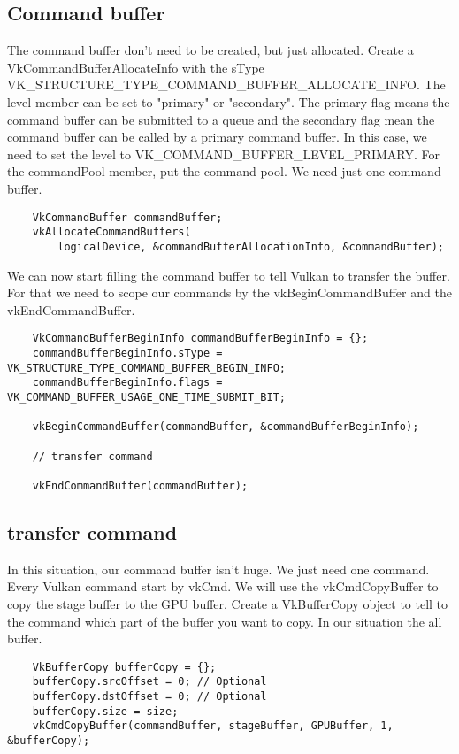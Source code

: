 \documentclass{article}
\begin{document}
\subsection{Command buffer}
The command buffer don't need to be created, but just allocated. Create a VkCommandBufferAllocateInfo with the sType VK\_STRUCTURE\_TYPE\_COMMAND\_BUFFER\_ALLOCATE\_INFO. The level member can be set to "primary" or "secondary". The primary flag means the command buffer can be submitted to a queue and the secondary flag mean the command buffer can be called by a primary command buffer. In this case, we need to set the level to VK\_COMMAND\_BUFFER\_LEVEL\_PRIMARY. For the commandPool member, put the command pool. We need just one command buffer.
\begin{lstlisting}
	VkCommandBuffer commandBuffer;
	vkAllocateCommandBuffers(
		logicalDevice, &commandBufferAllocationInfo, &commandBuffer);
\end{lstlisting}
We can now start filling the command buffer to tell Vulkan to transfer the buffer. For that we need to scope our commands by the vkBeginCommandBuffer and the vkEndCommandBuffer.
\begin{lstlisting}
	VkCommandBufferBeginInfo commandBufferBeginInfo = {};
	commandBufferBeginInfo.sType = VK_STRUCTURE_TYPE_COMMAND_BUFFER_BEGIN_INFO;
	commandBufferBeginInfo.flags = VK_COMMAND_BUFFER_USAGE_ONE_TIME_SUBMIT_BIT;

	vkBeginCommandBuffer(commandBuffer, &commandBufferBeginInfo);

	// transfer command

	vkEndCommandBuffer(commandBuffer);
\end{lstlisting}

\subsection{transfer command}
In this situation, our command buffer isn't huge. We just need one command. Every Vulkan command start by vkCmd. We will use the vkCmdCopyBuffer to copy the stage buffer to the GPU buffer. Create a VkBufferCopy object to tell to the command which part of the buffer you want to copy. In our situation the all buffer.
\begin{lstlisting}
	VkBufferCopy bufferCopy = {};
	bufferCopy.srcOffset = 0; // Optional
	bufferCopy.dstOffset = 0; // Optional
	bufferCopy.size = size;
	vkCmdCopyBuffer(commandBuffer, stageBuffer, GPUBuffer, 1, &bufferCopy);
\end{lstlisting}
\end{document}

